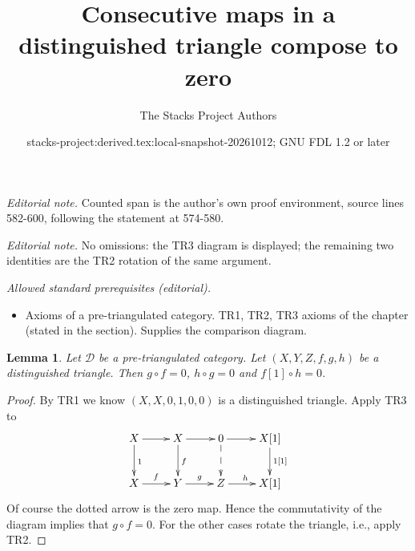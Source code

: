 \documentclass{stacks-project}
\title{Consecutive maps in a distinguished triangle compose to zero}
\author{The Stacks Project Authors}
\date{stacks-project:derived.tex:local-snapshot-20261012; GNU FDL 1.2 or later}
\theoremstyle{plain}
\newtheorem{lemma}[subsection]{Lemma}
\theoremstyle{definition}
\theoremstyle{remark}
\numberwithin{equation}{subsection}
\begin{document}
\maketitle
\noindent\textit{Editorial note.} Counted span is the author's own proof environment, source lines 582-600, following the statement at 574-580.\par\medskip
\noindent\textit{Editorial note.} No omissions: the TR3 diagram is displayed; the remaining two identities are the TR2 rotation of the same argument.\par\medskip
\noindent\textit{Allowed standard prerequisites (editorial).}\begin{itemize}
\item Axioms of a pre-triangulated category. TR1, TR2, TR3 axioms of the chapter (stated in the section). Supplies the comparison diagram.
\end{itemize}\medskip
\begin{lemma}
\label{lemma-composition-zero}
Let $\mathcal{D}$ be a pre-triangulated category.
Let $(X, Y, Z, f, g, h)$ be a distinguished triangle.
Then $g \circ f = 0$,
$h \circ g = 0$ and $f[1] \circ h = 0$.
\end{lemma}

\begin{proof}
By TR1 we know $(X, X, 0, 1, 0, 0)$ is a distinguished triangle.
Apply TR3 to
$$
\xymatrix{
X \ar[r] \ar[d]^1 &
X \ar[r] \ar[d]^f &
0 \ar[r] \ar@{-->}[d] &
X[1] \ar[d]^{1[1]} \\
X \ar[r]^f &
Y \ar[r]^g &
Z \ar[r]^h &
X[1]
}
$$
Of course the dotted arrow is the zero map. Hence the commutativity of
the diagram implies that $g \circ f = 0$. For the other cases
rotate the triangle, i.e., apply TR2.
\end{proof}
\end{document}
